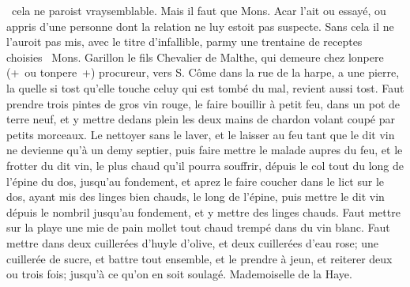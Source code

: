 %
~cela ne paroist vraysemblable. Mais il faut que Mons. Acar\protect{}
l'ait ou essay\'{e}, ou appris d'une personne dont la relation ne luy estoit pas suspecte. Sans cela il ne l'auroit pas mis, avec le titre d'infallible, parmy une trentaine de receptes choisies~%
\pend%
\pstart%
\protect{}
Mons. Garillon\protect{}
le fils Chevalier de Malthe, qui demeure chez lonpere (+~ou tonpere~+) procureur, vers S. C\^{o}me dans la rue de la harpe, a une pierre, la quelle si tost qu'elle touche celuy qui est tomb\'{e} du mal, revient aussi tost.
\pend%
\pstart%
Faut prendre trois pintes de gros vin\protect{} rouge, le faire bouillir \`{a} petit feu, dans un pot de terre neuf, et y mettre dedans plein les deux mains de chardon\protect{} volant coup\'{e} par petits morceaux. Le nettoyer sans le laver, et le laisser au feu tant que le dit vin\protect{} ne devienne qu'\`{a} un demy septier, puis faire mettre le malade aupres du feu, et le frotter du dit vin\protect{}, le plus chaud qu'il pourra souffrir, d\'{e}puis le col tout du long de l'\'{e}pine du dos, jusqu'au fondement, et aprez le faire coucher dans le lict sur le dos, ayant mis des linges bien chauds, le long de l'\'{e}pine, puis mettre le dit vin\protect{} d\'{e}puis le nombril jusqu'au fondement, et y mettre des linges chauds.
\pend%
\pstart%
\protect{}
Faut mettre sur la playe une mie de pain mollet tout chaud tremp\'{e} dans du vin\protect{} blanc.
\pend%
\pstart%
Faut mettre dans deux cuiller\'{e}es d'huyle d'olive, et deux cuiller\'{e}es d'eau rose;\protect{}
une cuiller\'{e}e de sucre, et battre tout ensemble, et le prendre \`{a} jeun, et reiterer deux ou trois fois; jusqu'\`{a} ce qu'on en soit soulag\'{e}.
Mademoiselle de la Haye\protect{}.
\pend%
